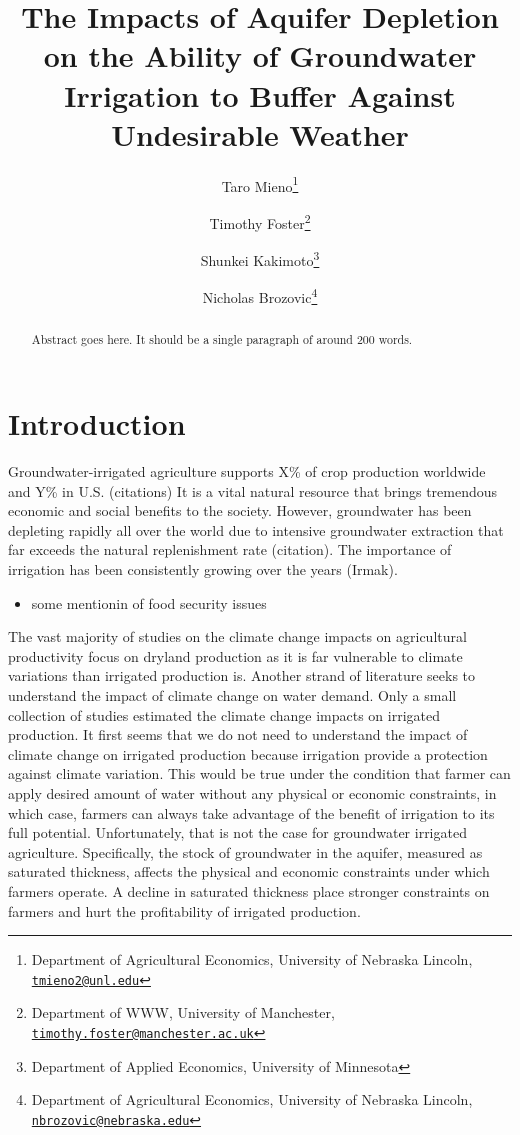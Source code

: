 \documentclass[
]{article}
\title{The Impacts of Aquifer Depletion on the Ability of Groundwater Irrigation to Buffer Against Undesirable Weather}
\author{Taro Mieno\footnote{Department of Agricultural Economics, University of Nebraska Lincoln, \href{mailto:tmieno2@unl.edu}{\nolinkurl{tmieno2@unl.edu}}} \and Timothy Foster\footnote{Department of WWW, University of Manchester, \href{mailto:timothy.foster@manchester.ac.uk}{\nolinkurl{timothy.foster@manchester.ac.uk}}} \and Shunkei Kakimoto\footnote{Department of Applied Economics, University of Minnesota} \and Nicholas Brozovic\footnote{Department of Agricultural Economics, University of Nebraska Lincoln, \href{mailto:nbrozovic@nebraska.edu}{\nolinkurl{nbrozovic@nebraska.edu}}}}
\date{}
\providecommand{\tightlist}{%
  \setlength{\itemsep}{0pt}\setlength{\parskip}{0pt}}
\begin{document}
\maketitle
\begin{abstract}
Abstract goes here. It should be a single paragraph of around 200 words.
\end{abstract}

\hypertarget{introduction}{%
\section{Introduction}\label{introduction}}

Groundwater-irrigated agriculture supports X\% of crop production worldwide and Y\% in U.S. (citations) It is a vital natural resource that brings tremendous economic and social benefits to the society. However, groundwater has been depleting rapidly all over the world due to intensive groundwater extraction that far exceeds the natural replenishment rate (citation). The importance of irrigation has been consistently growing over the years (Irmak).

\begin{itemize}
\tightlist
\item
  some mentionin of food security issues
\end{itemize}

The vast majority of studies on the climate change impacts on agricultural productivity focus on dryland production as it is far vulnerable to climate variations than irrigated production is. Another strand of literature seeks to understand the impact of climate change on water demand. Only a small collection of studies estimated the climate change impacts on irrigated production. It first seems that we do not need to understand the impact of climate change on irrigated production because irrigation provide a protection against climate variation. This would be true under the condition that farmer can apply desired amount of water without any physical or economic constraints, in which case, farmers can always take advantage of the benefit of irrigation to its full potential. Unfortunately, that is not the case for groundwater irrigated agriculture. Specifically, the stock of groundwater in the aquifer, measured as saturated thickness, affects the physical and economic constraints under which farmers operate. A decline in saturated thickness place stronger constraints on farmers and hurt the profitability of irrigated production.
\end{document}
